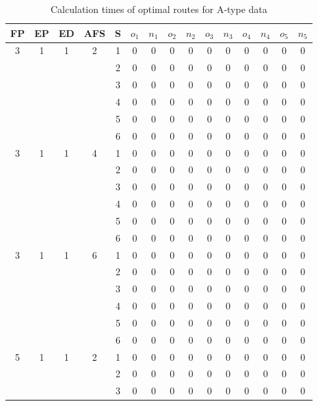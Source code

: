 \begin{longtable}{|c|c|c|c|c|c c|c c|c c|c c|c c|}
\caption{Calculation times of optimal routes for A-type data}
\label{tab:time_a} \\
\hline
FP  & EP & ED & AFS & S & $o_1$ & $n_1$ & $o_2$ & $n_2$ & $o_3$ & $n_3$ & $o_4$ & $n_4$ & $o_5$ & $n_5$\\
\hline\hline\multirow{6}{*}{3} & \multirow{6}{*}{1} & \multirow{6}{*}{1} & \multirow{6}{*}{2} & 1 & 0 & 0 & 0 & 0 & 0 & 0 & 0 & 0 & 0 & 0 \\
 & & & & 2 & 0 & 0 & 0 & 0 & 0 & 0 & 0 & 0 & 0 & 0 \\
 & & & & 3 & 0 & 0 & 0 & 0 & 0 & 0 & 0 & 0 & 0 & 0 \\
 & & & & 4 & 0 & 0 & 0 & 0 & 0 & 0 & 0 & 0 & 0 & 0 \\
 & & & & 5 & 0 & 0 & 0 & 0 & 0 & 0 & 0 & 0 & 0 & 0 \\
 & & & & 6 & 0 & 0 & 0 & 0 & 0 & 0 & 0 & 0 & 0 & 0 \\
\hline
\multirow{6}{*}{3} & \multirow{6}{*}{1} & \multirow{6}{*}{1} & \multirow{6}{*}{4} & 1 & 0 & 0 & 0 & 0 & 0 & 0 & 0 & 0 & 0 & 0 \\
 & & & & 2 & 0 & 0 & 0 & 0 & 0 & 0 & 0 & 0 & 0 & 0 \\
 & & & & 3 & 0 & 0 & 0 & 0 & 0 & 0 & 0 & 0 & 0 & 0 \\
 & & & & 4 & 0 & 0 & 0 & 0 & 0 & 0 & 0 & 0 & 0 & 0 \\
 & & & & 5 & 0 & 0 & 0 & 0 & 0 & 0 & 0 & 0 & 0 & 0 \\
 & & & & 6 & 0 & 0 & 0 & 0 & 0 & 0 & 0 & 0 & 0 & 0 \\
\hline
\multirow{6}{*}{3} & \multirow{6}{*}{1} & \multirow{6}{*}{1} & \multirow{6}{*}{6} & 1 & 0 & 0 & 0 & 0 & 0 & 0 & 0 & 0 & 0 & 0 \\
 & & & & 2 & 0 & 0 & 0 & 0 & 0 & 0 & 0 & 0 & 0 & 0 \\
 & & & & 3 & 0 & 0 & 0 & 0 & 0 & 0 & 0 & 0 & 0 & 0 \\
 & & & & 4 & 0 & 0 & 0 & 0 & 0 & 0 & 0 & 0 & 0 & 0 \\
 & & & & 5 & 0 & 0 & 0 & 0 & 0 & 0 & 0 & 0 & 0 & 0 \\
 & & & & 6 & 0 & 0 & 0 & 0 & 0 & 0 & 0 & 0 & 0 & 0 \\
\hline
\multirow{6}{*}{5} & \multirow{6}{*}{1} & \multirow{6}{*}{1} & \multirow{6}{*}{2} & 1 & 0 & 0 & 0 & 0 & 0 & 0 & 0 & 0 & 0 & 0 \\
 & & & & 2 & 0 & 0 & 0 & 0 & 0 & 0 & 0 & 0 & 0 & 0 \\
 & & & & 3 & 0 & 0 & 0 & 0 & 0 & 0 & 0 & 0 & 0 & 0 \\

\end{longtable}
